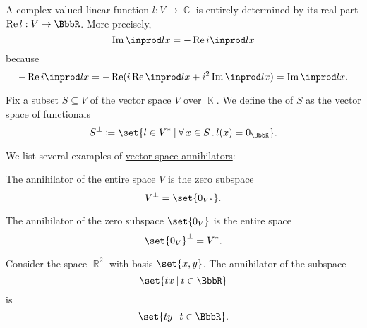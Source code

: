 \begin{remark}\label{rem:complex_linear_functional}
  A complex-valued linear function \( l: V \to \BbbC \) is entirely determined by its real part \( \real l: V \to \BbbR \). More precisely,
  \begin{equation*}
    \imag \inprod l x = -\real i \inprod l x
  \end{equation*}
  because
  \begin{equation*}
    -\real i \inprod l x
    =
    -\real (i \real \inprod l x + i^2 \imag \inprod l x)
    =
    \imag \inprod l x.
  \end{equation*}
\end{remark}

\begin{definition}\label{def:vector_space_annihilator}
  Fix a subset \( S \subseteq V \) of the vector space \( V \) over \( \BbbK \). We define the  of \( S \) as the vector space of functionals
  \begin{equation*}
    S^\perp \coloneqq \set{ l \in V^* \given \qforall {x \in S} l(x) = 0_\BbbK }.
  \end{equation*}
\end{definition}

\begin{example}\label{ex:def:vector_space_annihilator}
  We list several examples of \hyperref[def:vector_space_annihilator]{vector space annihilators}:
  \begin{thmenum}
     The annihilator of the entire space \( V \) is the zero subspace
    \begin{equation*}
      V^\perp = \set{ 0_{V^*} }.
    \end{equation*}

     The annihilator of the zero subspace \( \set{ 0_V } \) is the entire space
    \begin{equation*}
      \set{ 0_V }^\perp = V^*.
    \end{equation*}

     Consider the space \( \BbbR^2 \) with basis \( \set{ x, y } \). The annihilator of the subspace
    \begin{equation*}
      \set{ tx \given t \in \BbbR }
    \end{equation*}
    is
    \begin{equation*}
      \set{ ty \given t \in \BbbR }.
    \end{equation*}
  \end{thmenum}
\end{example}

